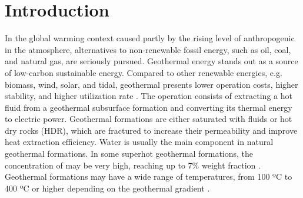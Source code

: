 
\section{Introduction}

In the global warming context caused partly by the rising level of anthropogenic  in the atmosphere, alternatives to non-renewable fossil energy, such as oil, coal, and natural gas, are seriously pursued. Geothermal energy stands out as a source of low-carbon sustainable energy. Compared to other renewable energies, e.g. biomass, wind, solar, and tidal, geothermal presents lower operation costs, higher stability, and higher utilization rate \cite{Wu2020}. The operation consists of extracting a hot fluid from a geothermal subsurface formation and converting its thermal energy to electric power. Geothermal formations are either saturated with fluids or hot dry rocks (HDR), which are fractured to increase their permeability and improve heat extraction efficiency. Water is usually the main component in natural geothermal formations. In some superhot geothermal formations, the concentration of  may be very high, reaching up to 7\% weight fraction \cite{Armannsson2017}. Geothermal formations may have a wide range of temperatures, from 100 ºC to 400 ºC or higher depending on the geothermal gradient \cite{Dickson2003}. 

